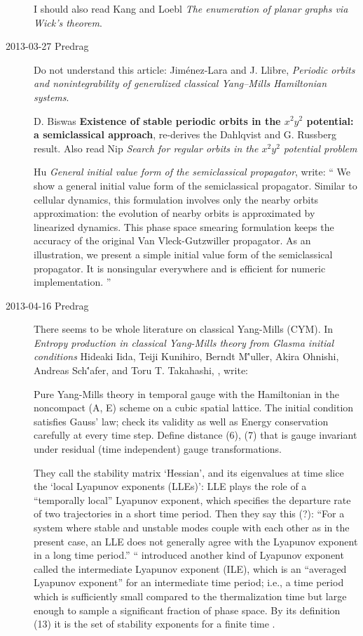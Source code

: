 \begin{description}
I should also read Kang and Loebl
{\em The enumeration of planar graphs via {Wick}'s theorem}.

\item[2013-03-27  Predrag] Do not understand this article:
Jim\'enez-Lara and J. Llibre,
{\em Periodic orbits and nonintegrability of generalized
classical {Yang--Mills Hamiltonian} systems}.

                                                \toCB
D. Biswas \etal{} {\bf Existence of stable periodic orbits
in the $x^2y^2$ potential: a semiclassical approach}, re-derives the
Dahlqvist and G. Russberg result. Also read Nip
\etal{} {\em Search for regular orbits in the $x^2y^2$
potential problem}

Hu
{\em General initial value form of the semiclassical propagator},
write: ``
We show a general initial value form of the semiclassical propagator.
Similar to cellular dynamics, this formulation involves only the
nearby orbits approximation: the evolution of nearby orbits is
approximated by linearized dynamics. This phase space smearing
formulation keeps the accuracy of the original Van Vleck-Gutzwiller
propagator. As an illustration, we present a simple initial value
form of the semiclassical propagator. It is nonsingular everywhere
and is efficient for numeric implementation.
''

\item[2013-04-16  Predrag] There seems to be whole literature on
classical Yang-Mills (CYM). In
{\em Entropy production in classical Yang-Mills theory from Glasma
initial conditions} Hideaki Iida,  Teiji Kunihiro,  Berndt M\''uller,
Akira Ohnishi,  Andreas Sch\''afer,  and Toru T. Takahashi,
, %
write:

Pure Yang-Mills theory in temporal gauge with the Hamiltonian in the
noncompact (A, E) scheme on a cubic spatial lattice. The initial
condition satisfies Gauss' law; check its validity as well as Energy
conservation carefully at every time step. Define distance (6), (7) that
is gauge invariant under residual (time independent) gauge transformations.

                                                    \inCB
They call the stability matrix `Hessian', and its eigenvalues at time
slice the `local Lyapunov exponents (LLEs)': LLE plays the
role of a ``temporally local'' Lyapunov exponent, which specifies the
departure rate of two trajectories in a short time period. Then they say
this (?): ``For a system where stable and unstable modes couple with each
other as in the present case, an LLE does not generally agree with the
Lyapunov exponent in a long time period.'' `` introduced
another kind of Lyapunov exponent called the intermediate Lyapunov
exponent (ILE), which is an ``averaged Lyapunov exponent'' for an
intermediate time period; i.e., a time period which is sufficiently small
compared to the thermalization time but large enough to sample a
significant fraction of phase space. By its definition (13) it
is the set of stability exponents for a finite time \jacobianM.


\end{description}
